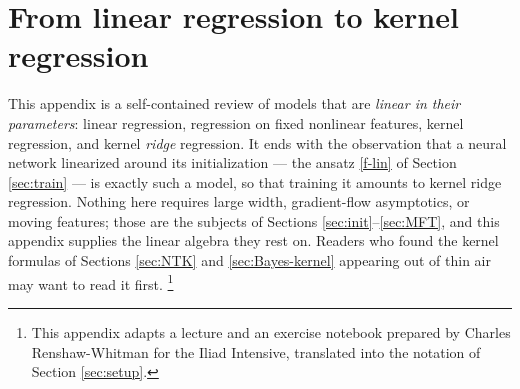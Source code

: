 \documentclass[11pt]{article}
\begin{document}
\section{From linear regression to kernel regression}
\label{app:kernels}

This appendix is a self-contained review of models that are \emph{linear in their parameters}: linear regression, regression on fixed nonlinear features, kernel regression, and kernel \emph{ridge} regression. It ends with the observation that a neural network linearized around its initialization --- the ansatz \eqref{f-lin} of Section \ref{sec:train} --- is exactly such a model, so that training it amounts to kernel ridge regression. Nothing here requires large width, gradient-flow asymptotics, or moving features; those are the subjects of Sections \ref{sec:init}--\ref{sec:MFT}, and this appendix supplies the linear algebra they rest on. Readers who found the kernel formulas of Sections \ref{sec:NTK} and \ref{sec:Bayes-kernel} appearing out of thin air may want to read it first.%
\footnote{This appendix adapts a lecture and an exercise notebook prepared by Charles Renshaw-Whitman for the Iliad Intensive, translated into the notation of Section \ref{sec:setup}.}
\end{document}
